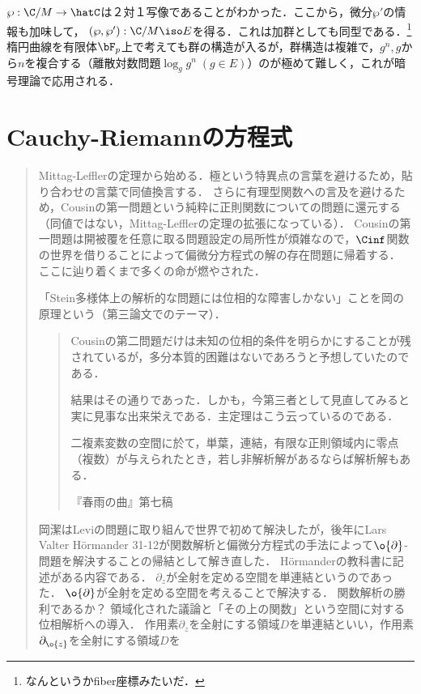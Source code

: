 \documentclass[uplatex, dvipdfmx]{jsreport}
\begin{document}
\begin{tcolorbox}[colframe=ForestGreen, colback=ForestGreen!10!white,breakable,colbacktitle=ForestGreen!40!white,coltitle=black,fonttitle=\bfseries\sffamily,
title=]
    $\wp:\C/M\to\hatC$は２対１写像であることがわかった．ここから，微分$\wp'$の情報も加味して，
    $(\wp,\wp'):\C/M\iso E$を得る．これは加群としても同型である．\footnote{なんというかfiber座標みたいだ．}
    楕円曲線を有限体$\bF_p$上で考えても群の構造が入るが，群構造は複雑で，$g^n,g$から$n$を複合する（離散対数問題$\log_gg^n\;(g\in E)$）のが極めて難しく，これが暗号理論で応用される．
\end{tcolorbox}

\chapter{Cauchy-Riemannの方程式}

\begin{quotation}
    Mittag-Lefflerの定理から始める．極という特異点の言葉を避けるため，貼り合わせの言葉で同値換言する．
    さらに有理型関数への言及を避けるため，Cousinの第一問題という純粋に正則関数についての問題に還元する（同値ではない，Mittag-Lefflerの定理の拡張になっている）．
    Cousinの第一問題は開被覆を任意に取る問題設定の局所性が煩雑なので，$\Cinf$関数の世界を借りることによって偏微分方程式の解の存在問題に帰着する．
    ここに辿り着くまで多くの命が燃やされた．
    
    「Stein多様体上の解析的な問題には位相的な障害しかない」ことを岡の原理という（第三論文でのテーマ）．
    \begin{quote}
        Cousinの第二問題だけは未知の位相的条件を明らかにすることが残されているが，多分本質的困難はないであろうと予想していたのである．

        結果はその通りであった．しかも，今第三者として見直してみると実に見事な出来栄えである．主定理はこう云っているのである．

        二複素変数の空間に於て，単葉，連結，有限な正則領域内に零点（複数）が与えられたとき，若し非解析解があるならば解析解もある．
        
        『春雨の曲』第七稿
    \end{quote}
    岡潔はLeviの問題に取り組んで世界で初めて解決したが，後年にLars Valter Hörmander 31-12が関数解析と偏微分方程式の手法によって$\o{\partial}$-問題を解決することの帰結として解き直した．
    Hörmanderの教科書に記述がある内容である．
    $\partial_z$が全射を定める空間を単連結というのであった．
    $\o{\partial}$が全射を定める空間を考えることで解決する．
    関数解析の勝利であるか？
    領域化された議論と「その上の関数」という空間に対する位相解析への導入．
    作用素$\partial_z$を全射にする領域$D$を単連結といい，作用素$\partial_{\o{z}}$を全射にする領域$D$を
\end{quotation}
\end{document}
